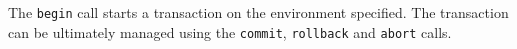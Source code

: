 The \verb+begin+ call starts a transaction on the environment specified. The transaction can be
ultimately managed using the \verb+commit+, \verb+rollback+ and \verb+abort+ calls.
